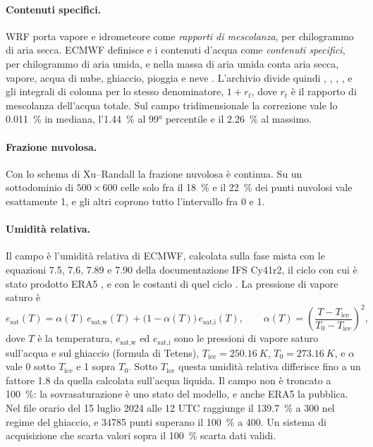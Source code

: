 \paragraph{Contenuti specifici.} WRF porta vapore e idrometeore come \emph{rapporti di mescolanza},
per chilogrammo di aria secca. ECMWF definisce  e i contenuti d'acqua come \emph{contenuti
specifici}, per chilogrammo di aria umida, e nella massa di aria umida conta aria secca, vapore, acqua di nube,
ghiaccio, pioggia e neve \parencite{paramdb}. L'archivio divide quindi , ,
, ,  e gli integrali di colonna per lo stesso denominatore,
$1 + r_t$, dove $r_t$ è il rapporto di mescolanza dell'acqua totale. Sul campo tridimensionale la
correzione vale lo \SI{0.011}{\percent} in mediana, l'\SI{1.44}{\percent} al 99° percentile e il
\SI{2.26}{\percent} al massimo.

\paragraph{Frazione nuvolosa.} Con lo schema di Xu--Randall la frazione nuvolosa  è
continua. Su un sottodominio di $500 \times 600$ celle solo fra il \SI{18}{\percent} e il
\SI{22}{\percent} dei punti nuvolosi vale esattamente 1, e gli altri coprono tutto l'intervallo fra 0 e 1.

\paragraph{Umidità relativa.} Il campo  è l'umidità relativa di ECMWF, calcolata sulla fase
mista con le equazioni 7.5, 7.6, 7.89 e 7.90 della documentazione IFS Cy41r2, il ciclo con cui è
stato prodotto ERA5 \parencite{era5doc}, e con le costanti di quel ciclo \parencite{ifs41r2p4}. La pressione di vapore
saturo è
\begin{equation}
  e_\text{sat}(T) = \alpha(T)\, e_\text{sat,w}(T) + \bigl(1 - \alpha(T)\bigr)\, e_\text{sat,i}(T),
  \qquad
  \alpha(T) = \left(\frac{T - T_\text{ice}}{T_0 - T_\text{ice}}\right)^{2},
  \label{eq:fase-mista}
\end{equation}
dove $T$ è la temperatura, $e_\text{sat,w}$ ed $e_\text{sat,i}$ sono le pressioni di vapore saturo sull'acqua e sul
ghiaccio (formula di Tetens), $T_\text{ice} = \SI{250.16}{K}$, $T_0 = \SI{273.16}{K}$, e $\alpha$ vale
0 sotto $T_\text{ice}$ e 1 sopra $T_0$. Sotto $T_\text{ice}$ questa umidità relativa differisce fino a
un fattore \num{1.8} da quella calcolata sull'acqua liquida. Il campo non è troncato a \SI{100}{\percent}:
la sovrasaturazione è uno stato del modello, e anche ERA5 la pubblica. Nel file orario del 15 luglio 2024 alle 12 UTC
 raggiunge il \SI{139.7}{\percent} a \SI{300}{\hPa} nel regime del ghiaccio, e \num{34785} punti
superano il \SI{100}{\percent} a \SI{400}{\hPa}. Un sistema di acquisizione che scarta valori
sopra il \SI{100}{\percent} scarta dati validi.

